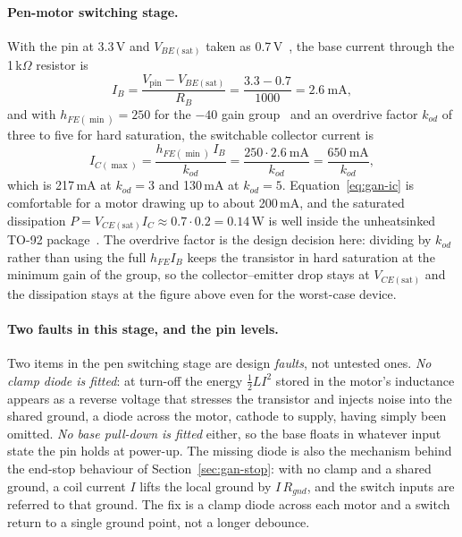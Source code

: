 \paragraph{Pen-motor switching stage.}
With the pin at 3.3\,V and $V_{BE(\mathrm{sat})}$ taken as 0.7\,V~\cite{bc337ds}, the base current through the 1\,k$\Omega$ resistor is
\begin{equation}
I_B=\frac{V_{\mathrm{pin}}-V_{BE(\mathrm{sat})}}{R_B}=\frac{3.3-0.7}{1000}=2.6\ \mathrm{mA},
\label{eq:gan-base}
\end{equation}
and with $h_{FE(\min)}=250$ for the $-40$ gain group~\cite{bc337ds} and an overdrive factor $k_{od}$ of three to five for hard saturation, the switchable collector current is
\begin{equation}
I_{C(\max)}=\frac{h_{FE(\min)}\,I_B}{k_{od}}=\frac{250\cdot2.6\ \mathrm{mA}}{k_{od}}=\frac{650\ \mathrm{mA}}{k_{od}},
\label{eq:gan-ic}
\end{equation}
which is 217\,mA at $k_{od}=3$ and 130\,mA at $k_{od}=5$. Equation~\ref{eq:gan-ic} is comfortable for a motor drawing up to about 200\,mA, and the saturated dissipation $P=V_{CE(\mathrm{sat})}I_C\approx0.7\cdot0.2=0.14$\,W is well inside the unheatsinked TO-92 package~\cite{bc337ds}. The overdrive factor is the design decision here: dividing by $k_{od}$ rather than using the full $h_{FE}I_B$ keeps the transistor in hard saturation at the minimum gain of the group, so the collector--emitter drop stays at $V_{CE(\mathrm{sat})}$ and the dissipation stays at the figure above even for the worst-case device.

\paragraph{Two faults in this stage, and the pin levels.}
Two items in the pen switching stage are design \emph{faults}, not untested ones. \emph{No clamp diode is fitted}: at turn-off the energy $\tfrac12LI^2$ stored in the motor's inductance appears as a reverse voltage that stresses the transistor and injects noise into the shared ground, a diode across the motor, cathode to supply, having simply been omitted. \emph{No base pull-down is fitted} either, so the base floats in whatever input state the pin holds at power-up. The missing diode is also the mechanism behind the end-stop behaviour of Section~\ref{sec:gan-stop}: with no clamp and a shared ground, a coil current $I$ lifts the local ground by $I\,R_{gnd}$, and the switch inputs are referred to that ground. The fix is a clamp diode across each motor and a switch return to a single ground point, not a longer debounce.

